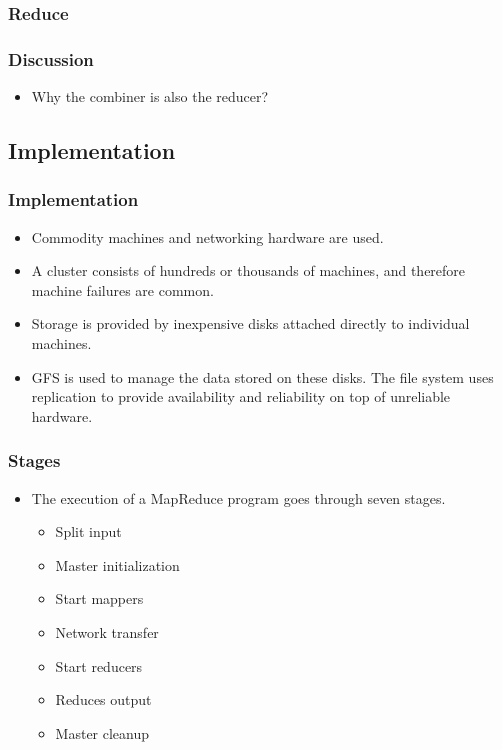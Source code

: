 \documentclass{beamer}
\begin{document}
\begin{frame}
  \frametitle{Reduce}
\end{frame}

\begin{frame}
  \frametitle{Discussion}
  \begin{itemize}
    \item Why the combiner is also the reducer?
  \end{itemize}
\end{frame}

\subsection{Implementation}

\begin{frame}
  \frametitle{Implementation}
  \begin{itemize}
    \item Commodity machines and networking hardware are used.
    \item A cluster consists of hundreds or thousands of machines,
      and therefore machine failures are common.  
    \item Storage is provided by inexpensive disks attached directly
      to individual machines.
    \item GFS is used to manage the data stored on these disks. The
      file system uses replication to provide availability and
      reliability on top of unreliable hardware.
  \end{itemize}
\end{frame}

\begin{frame}
  \frametitle{Stages}
  \begin{itemize}
    \item The execution of a MapReduce program goes through seven
      stages.
      \begin{itemize}
      \item Split input
      \item Master initialization
      \item Start mappers
      \item Network transfer
      \item Start reducers
      \item Reduces output
      \item Master cleanup
      \end{itemize}
  \end{itemize}
\end{frame}
\end{document}
